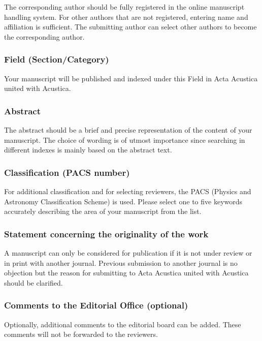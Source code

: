 \documentclass[twoside,twocolumn]{article}
\begin{document}
The corresponding author should be fully registered in the online
manuscript handling system. For other authors that are not registered,
entering name and affiliation is sufficient. The submitting author can
select other authors to become the corresponding author.

\subsubsection{Field (Section/Category)}

Your manuscript will be published and indexed under this Field in Acta
Acustica united with Acustica.

\subsubsection{Abstract}

The abstract should be a brief and precise representation of the content
of your manuscript. The choice of wording is of utmost importance since
searching in different indexes is mainly based on the abstract text.

\subsubsection{Classification (PACS number)}

For additional classification and for selecting reviewers, the PACS
(Physics and Astronomy Classification Scheme) is used. Please select one
to five keywords accurately describing the area of your manuscript from
the list.

\subsubsection{Statement concerning the originality of the work}

A manuscript can only be considered for publication if it is not under
review or in print with another journal. Previous submission to another
journal is no objection but the reason for submitting to Acta Acustica
united with Acustica should be clarified.

\subsubsection{Comments to the Editorial Office (optional)}

Optionally, additional comments to the editorial board can be added.
These comments will not be forwarded to the reviewers.
\end{document}
